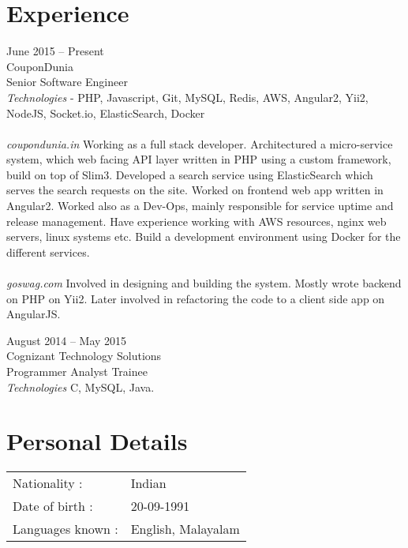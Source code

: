 \documentclass[a4paper]{article}
\begin{document}
\section{Experience}
\begin{CV}
\item[June 2015 -- Present]
    ~\\
    CouponDunia\\
    Senior Software Engineer\\
    \emph{Technologies} - PHP, Javascript, Git, MySQL, Redis, AWS, Angular2, Yii2, NodeJS, Socket.io, ElasticSearch, Docker \\\\
    \emph{coupondunia.in} Working as a full stack developer. Architectured a micro-service system, which web facing API layer
    written in PHP using a custom framework, build on top of Slim3. Developed a search service using ElasticSearch which serves 
    the search requests on the site. Worked on frontend web app written in Angular2. Worked also as a Dev-Ops, mainly responsible for
    service uptime and release management. Have experience working with AWS resources, nginx web servers, linux systems etc. Build a
    development environment using Docker for the different services.\\\\
    \emph{goswag.com} Involved in designing and building the system. Mostly wrote backend on PHP on Yii2. Later involved in refactoring 
    the code to a client side app on AngularJS.\\
\end{CV}

\begin{CV}
\item[August 2014 -- May 2015]
    ~\\
    Cognizant Technology Solutions\\
    Programmer Analyst Trainee\\
    \emph{Technologies} C, MySQL, Java.
\end{CV}

\section{Personal Details}
\begin{flushleft}
    \begin{tabular}{ll}
        Nationality : & Indian\\
        Date of birth : & 20-09-1991 \\
        Languages known : & English, Malayalam
    \end{tabular}
\end{flushleft}
\end{document}
